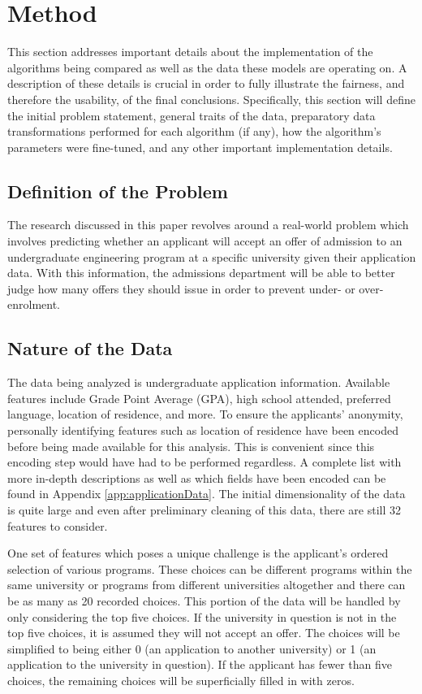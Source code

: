 \chapter{Method}
This section addresses important details about the implementation of the algorithms being compared as well as the data these models are operating on. A description of these details is crucial in order to fully illustrate the fairness, and therefore the usability, of the final conclusions. Specifically, this section will define the initial problem statement, general traits of the data, preparatory data transformations performed for each algorithm (if any), how the algorithm's parameters were fine-tuned, and any other important implementation details.



\section{Definition of the Problem}
The research discussed in this paper revolves around a real-world problem which involves predicting whether an applicant will accept an offer of admission to an undergraduate engineering program at a specific university given their application data. With this information, the admissions department will be able to better judge how many offers they should issue in order to prevent under- or over-enrolment.



\section{Nature of the Data}
The data being analyzed is undergraduate application information. Available features include Grade Point Average (GPA), high school attended, preferred language, location of residence, and more. To ensure the applicants' anonymity, personally identifying features such as location of residence have been encoded before being made available for this analysis. This is convenient since this encoding step would have had to be performed regardless. A complete list with more in-depth descriptions as well as which fields have been encoded can be found in Appendix \ref{app:applicationData}. The initial dimensionality of the data is quite large and even after preliminary cleaning of this data, there are still 32 features to consider.

One set of features which poses a unique challenge is the applicant's ordered selection of various programs. These choices can be different programs within the same university or programs from different universities altogether and there can be as many as 20 recorded choices. This portion of the data will be handled by only considering the top five choices. If the university in question is not in the top five choices, it is assumed they will not accept an offer. The choices will be simplified to being either 0 (an application to another university) or 1 (an application to the university in question). If the applicant has fewer than five choices, the remaining choices will be superficially filled in with zeros.

